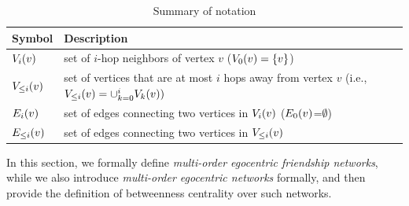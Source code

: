 \begin{table}[t]
\captionsetup[subfigure]{aboveskip=-2pt, belowskip=-1pt}
\center
\caption{Summary of notation}\label{table:symbols}
\small
    \begin{tabular}{| p{1.2cm} | p{10cm} |}
        \hline
        Symbol & Description \\
        \hline
        \hline
        $\V{v}{i}$ & set of $i$-hop neighbors of vertex $v$ ($\V{v}{0} = \{ v \}$)\\
        $\LV{v}{i}$ & set of vertices that are at most $i$ hops away from vertex $v$ (i.e., $\LV{v}{i} = \cup_{k = 0}^{i} \V{v}{k}) $\\
        $\E{v}{i}$ & set of edges connecting two vertices in $\V{v}{i}$ ($\E{v}{0}$=$\emptyset$)\\
        $\LE{v}{i}$ & set of edges connecting two vertices in $\LV{v}{i}$\\
        \hline
    \end{tabular}
\end{table}
In this section, we formally define {\it multi-order egocentric friendship networks}, while we also introduce {\it multi-order egocentric networks} formally, and then provide the definition of betweenness centrality over such networks.

